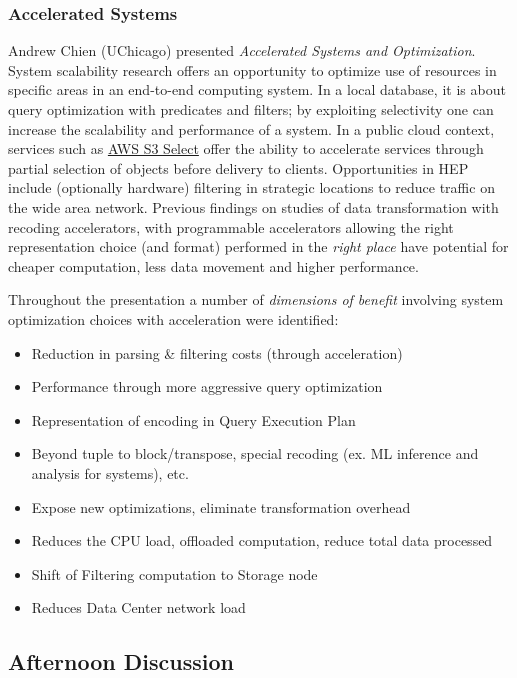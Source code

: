 \documentclass[11pt,letterpaper,fleqn]{article}
\begin{document}
\subsubsection{Accelerated Systems}

Andrew Chien (UChicago) presented {\it Accelerated Systems and Optimization}.  System scalability research offers an opportunity to optimize use of resources in specific areas in an end-to-end computing system.   In a local database, it is about query optimization with predicates and filters; by exploiting selectivity one can increase the scalability and performance of a system. In a public cloud context, services such as \href{https://aws.amazon.com/blogs/aws/s3-glacier-select/}{AWS S3 Select} offer the ability to accelerate services through partial selection of objects before delivery to clients.  Opportunities in HEP include (optionally hardware) filtering in strategic locations to reduce traffic on the wide area network.  Previous findings on studies of data transformation with recoding accelerators, with programmable accelerators allowing the right representation choice (and format) performed in the {\it right place} have potential for cheaper computation, less data movement and higher performance.

Throughout the presentation a number of {\it dimensions of benefit} involving system optimization choices with acceleration were identified:

\begin{itemize}
  \item Reduction in parsing \& filtering costs (through acceleration)
  \item Performance through more aggressive query optimization
  \item Representation of encoding in Query Execution Plan
  \item Beyond tuple to block/transpose, special recoding (ex. ML inference and analysis for systems), etc.
  \item Expose new optimizations, eliminate transformation overhead
  \item Reduces the CPU load, offloaded computation, reduce total data processed
  \item Shift of Filtering computation to Storage node
  \item Reduces Data Center network load
\end{itemize}


\subsection{Afternoon Discussion}
\end{document}
